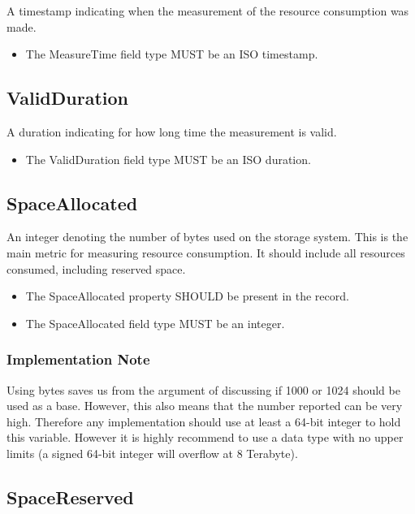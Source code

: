 A timestamp indicating when the measurement of the resource consumption was
made.

\begin{itemize}
\item The MeasureTime field type MUST be an ISO timestamp.
\end{itemize}


\subsection{ValidDuration}

A duration indicating for how long time the measurement is valid.

\begin{itemize}
\item The ValidDuration field type MUST be an ISO duration.
\end{itemize}


\subsection{SpaceAllocated}

An integer denoting the number of bytes used on the storage system. This is the
main metric for measuring resource consumption. It should include all resources
consumed, including reserved space.

\begin{itemize}
\item The SpaceAllocated property SHOULD be present in the record.
\item The SpaceAllocated field type MUST be an integer.
\end{itemize}

\subsubsection*{Implementation Note}

Using bytes saves us from the argument of discussing if 1000 or 1024 should be
used as a base. However, this also means that the number reported can be very
high. Therefore any implementation should use at least a 64-bit integer to hold
this variable. However it is highly recommend to use a data type with no upper
limits (a signed 64-bit integer will overflow at 8 Terabyte).


\subsection{SpaceReserved}

